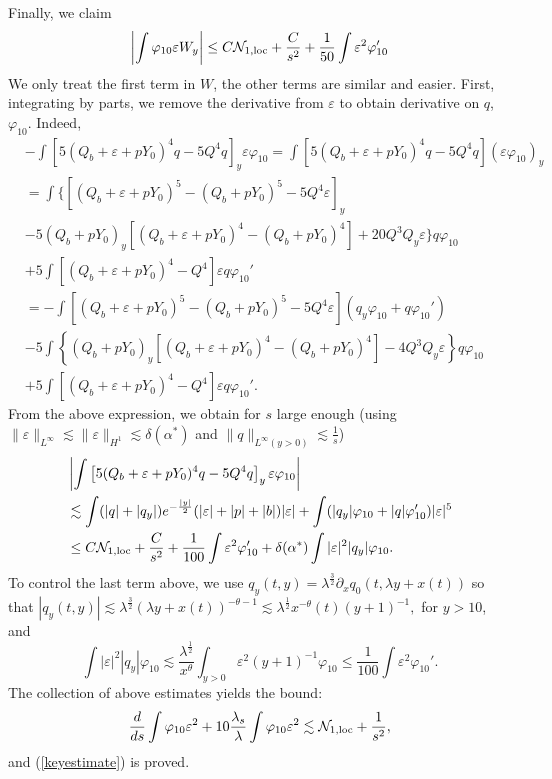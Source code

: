 \documentclass[11pt,a4paper,reqno]{amsart}
\theoremstyle{remark}
\numberwithin{equation}{section}
\newcommand{\be}{\begin{equation}}
\newcommand{\ee}{\end{equation}}
\def\fref#1{{\rm (\ref{#1})}}
\def\e{\varepsilon}
\def\fref#1{{\rm (\ref{#1})}}
\def\lsl{\frac{\lambda_s}{\lambda}}
\def\l{\lambda}
\def\lsl{\frac{\lambda_s}{\lambda}}
\def\Yz{Y_0}
\begin{document}
Finally, we claim
\be\label{Wdix}
\left| \int \varphi_{10} \e W_y\right|
\leq C \mathcal N_{1,\rm loc}+\frac C{s^2}  +  \frac 1{50} \int \e^2 \varphi_{10}'
\ee
We only treat the first term in $W$, the other terms are similar and easier.
First,  integrating by parts, we remove the derivative from $\e$ to obtain derivative on $q$, $\varphi_{10}$.
Indeed,
\begin{align*}
& - \int \left[ 5 (Q_b+\e+p\Yz )^4 q - 5 Q^4 q\right]_y \e \varphi_{10}  = \int \left[ 5 (Q_b+\e+p\Yz )^4 q - 5 Q^4 q\right]  (\e \varphi_{10})_y\\
& =\int \bigg\{\left[\left(Q_b+\e+p\Yz\right)^5- (Q_b+p\Yz)^5 - 5Q^4 \e\right]_y
\\
&- 5(Q_b+p\Yz)_y\left[(Q_b+\e+p\Yz)^4-(Q_b+p\Yz)^4\right] + 20 Q^3 Q_y \e \bigg\}q\varphi_{10}  
\\ &+ 5\int \left[   (Q_b+\e+p\Yz )^4   -   Q^4 \right]   \e q\varphi_{10}' 
\\
& = - \int \left[\left(Q_b+\e+p\Yz\right)^5-(Q_b+p\Yz)^5 - 5Q^4 \e\right] (q_y\varphi_{10}+q \varphi_{10}') 
\\
&- 5\int \left\{(Q_b+p\Yz)_y \left[(Q_b+\e+p\Yz)^4-(Q_b+p\Yz)^4\right] - 4 Q^3 Q_y \e \right\}  q\varphi_{10} 
\\ & + 5 \int \left[   (Q_b+\e+p\Yz )^4  -   Q^4  \right]   \e q \varphi_{10}'
.
\end{align*}
From the above expression, we obtain for $s$ large enough (using $\|\e\|_{L^\infty} \lesssim \|\e\|_{H^1}\lesssim 
\delta(\alpha^*)$ and $\|q\|_{L^\infty(y>0)} \lesssim \frac 1s$)
\begin{align*}
&\left| \int \left[ 5 (Q_b+\e+p\Yz )^4 q - 5 Q^4 q\right]_y \e \varphi_{10} \right|\\
& \lesssim 
\int (|q|+|q_y|) e^{-\frac {|y|}2} (|\e|+|p|+|b|)|\e|
+\int (|q_y|\varphi_{10} + |q|\varphi_{10}') |\e|^5 \\
& \leq  
C \mathcal N_{1,\rm loc}+\frac C{s^2}  +  \frac 1{100} \int \e^2 \varphi_{10}'+\delta(\alpha^*)\int   |\e|^2|q_y|\varphi_{10} .
\end{align*}
To control the last term above, we use
$q_y(t,y)=\l^{\frac 32} \partial_x q_0(t,\l y + x(t)) $ so that 
$
|q_y(t,y)|\lesssim \l^{\frac 32}  (\l y +x(t))^{-\theta-1} 
\lesssim \l^{\frac 12} x^{-\theta}(t) (y+1)^{-1},
$ for $y>10$,
and
$$
\int |\e|^2|q_y|\varphi_{10} \lesssim
\frac {\l^{\frac 12}}{x^{\theta}} \int_{y>0} \e^2 (y+1)^{-1} \varphi_{10}
\leq  \frac 1{100} \int \e^2 \varphi_{10}'.
$$
The collection of above estimates yields the bound: 
$$\frac{d}{ds}\int\varphi_{10}\e^2+{10}\lsl\int\varphi_{10}\e^2\lesssim \mathcal N_{1,\rm loc}+\frac 1{s^2},$$ and \fref{keyestimate} is proved.
\end{document}
